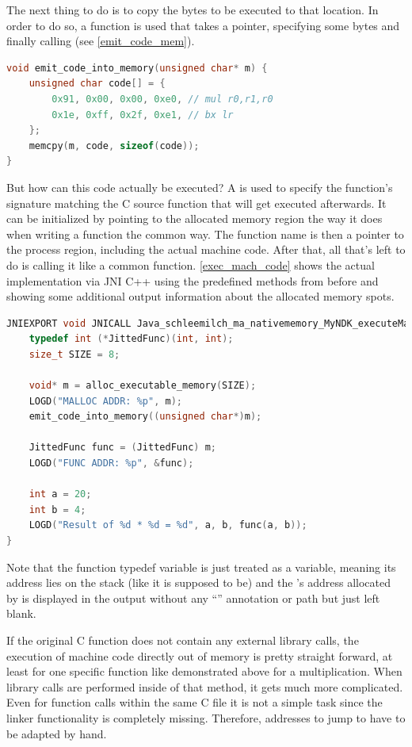 The next thing to do is to copy the bytes to be executed to that location. In order to do so, a function is used that takes a pointer, specifying some bytes and finally calling  (see \autoref{emit_code_mem}).
\begin{lstlisting}[language=C++, caption=emit\_code\_into\_memory(), label=emit_code_mem]
void emit_code_into_memory(unsigned char* m) {
    unsigned char code[] = {
        0x91, 0x00, 0x00, 0xe0, // mul r0,r1,r0
        0x1e, 0xff, 0x2f, 0xe1, // bx lr
    };
    memcpy(m, code, sizeof(code));
}
\end{lstlisting}
But how can this code actually be executed?
A  is used to specify the function's signature matching the C source function that will get executed afterwards.
It can be initialized by pointing to the allocated memory region the way it does when writing a function the common way. The function name is then a pointer to the process region, including the actual machine code.
After that, all that's left to do is calling it like a common function.
\autoref{exec_mach_code} shows the actual implementation via JNI C++ using the predefined methods from before and showing some additional output information about
the allocated memory spots.
\begin{lstlisting}[language=C++, caption=executeMachineCode(), label=exec_mach_code]
JNIEXPORT void JNICALL Java_schleemilch_ma_nativememory_MyNDK_executeMachineCode (JNIEnv *env, jobject obj){
    typedef int (*JittedFunc)(int, int);
    size_t SIZE = 8;

    void* m = alloc_executable_memory(SIZE);
    LOGD("MALLOC ADDR: %p", m);
    emit_code_into_memory((unsigned char*)m);

    JittedFunc func = (JittedFunc) m;
    LOGD("FUNC ADDR: %p", &func);

    int a = 20;
    int b = 4;
    LOGD("Result of %d * %d = %d", a, b, func(a, b));
}
\end{lstlisting}
Note that the function typedef variable  is just treated as a variable,
meaning its address lies on the stack (like it is supposed to be)
and the 's address allocated by  is displayed in the  output without any ``'' annotation or path but just left blank.

If the original C function does not contain any external library calls, the execution
of machine code directly out of memory is pretty straight forward, at least for one
specific function like demonstrated above for a multiplication. When library calls are performed inside of that method, it gets much more complicated. Even for function calls
within the same C file it is not a simple task since the linker functionality is
completely missing. Therefore, addresses to jump to
have to be adapted by hand.

